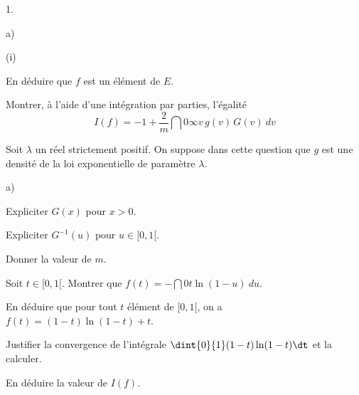 \begin{noliste}{1.}
\begin{noliste}{a)}
\begin{nonoliste}{(i)}
   
   
   \item En déduire que $f$ est un élément de $E$.
   
   
  \end{nonoliste}
  
  \item Montrer, à l'aide d'une intégration par parties, l'égalité
  \[
   I(f)= -1+\dfrac{2}{m} \dint{0}{\infty} v \, g(v) \, G(v) \ dv
  \]
  
  

 \end{noliste}
 
 
 
 
 \item Soit $\lambda$ un réel strictement positif. On suppose dans 
 cette question que $g$ est une densité de la loi exponentielle de 
 paramètre $\lambda$.
 \begin{noliste}{a)}
  \setlength{\itemsep}{2mm}
  \item Expliciter $G(x)$ pour $x >0$. 
  
  
  
  \item Expliciter $G^{-1}(u)$ pour $u \in [0,1[$. 
  
  

  
  \item Donner la valeur de $m$. 
  
  

  
  \item Soit $t \in[0,1[$. Montrer que $f(t)= - \dint{0}{t} \ln(1-u) 
  \ du.$
  
  

  
  
  
  
  \item En déduire que pour tout $t$ élément de $[0,1[$, on a $f(t)= 
  (1-t)\ln(1-t)+t$. 
  
  
  
  
  
  

  
  \item Justifier la convergence de l'intégrale $\dint{0}{1} 
  (1-t)\ln(1-t) \dt$ et la calculer. 
  
  
  
  \item En déduire la valeur de $I(f)$.
  
  
 \end{noliste}
\end{noliste}


